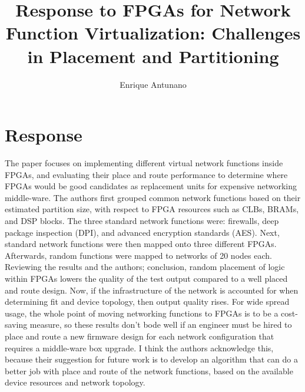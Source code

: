 \documentclass{article}
\title{Response to FPGAs for Network Function Virtualization:
Challenges in Placement and Partitioning}
\author{Enrique Antunano}
\begin{document}
\maketitle

\section{Response}
The paper focuses on implementing different virtual network functions inside FPGAs, and evaluating their place and route performance to determine where FPGAs would be good candidates as replacement units for expensive networking middle-ware. The authors first grouped common network functions based on their estimated partition size, with respect to FPGA resources such as CLBs, BRAMs, and DSP blocks. The three standard network functions were: firewalls, deep package inspection (DPI),
and advanced encryption standards (AES). Next, standard network functions were then mapped onto three different FPGAs. Afterwards, random functions were mapped to networks of 20 nodes each. Reviewing the results and the authors; conclusion, random placement of logic within FPGAs lowers the quality of the test output compared to a well placed and route design. Now, if the infrastructure of the network is accounted for when determining fit and device topology, then output quality rises. For wide spread usage, the whole point of moving networking functions to FPGAs is to be a cost-saving measure, so these results don't bode well if an engineer must be hired to place and route a new firmware design for each network configuration that requires a middle-ware box upgrade. I think the authors acknowledge this, because their suggestion for future work is to develop an algorithm that can do a better job with place and route of the network functions, based on the available device resources and network topology.
\end{document}
